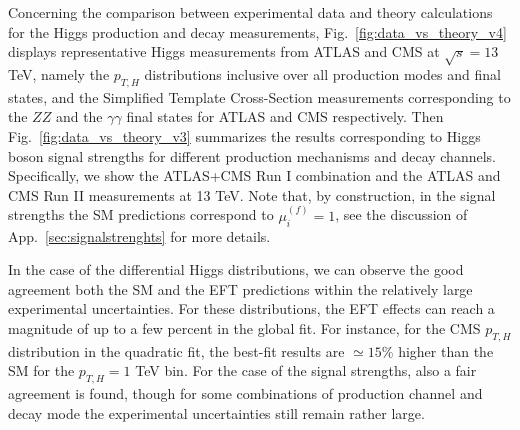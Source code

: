 Concerning the comparison between experimental data and theory calculations for the Higgs production
and decay measurements,  Fig.~\ref{fig:data_vs_theory_v4} displays
representative Higgs  measurements from ATLAS and CMS at $\sqrt{s}=13$ TeV,
namely the $p_{T,H}$ distributions inclusive over all production modes and final states,
and the Simplified Template Cross-Section measurements 
corresponding
to the $ZZ$  and the $\gamma\gamma$ final states for ATLAS and CMS
respectively.
%
Then Fig.~\ref{fig:data_vs_theory_v3} summarizes
the results corresponding to Higgs boson signal strengths for
different production mechanisms and decay channels.
%
Specifically, we show  the ATLAS+CMS Run I combination and the ATLAS and CMS Run II measurements at 13 TeV.
%
Note that, by construction, in the signal strengths the SM predictions correspond to $\mu_i^{(f)}=1$,
see the discussion of App.~\ref{sec:signalstrenghts} for more details.

In the case of the differential Higgs distributions, we can observe the good agreement
both the SM and the EFT predictions within the relatively large
experimental uncertainties.
%
For these distributions, the EFT effects can reach a magnitude of up to a few percent
in the global fit.
%
For instance, for the CMS $p_{T,H}$ distribution in the quadratic fit,
the best-fit results are $\simeq 15\%$ higher than the SM for the $p_{T,H}=1$ TeV bin.
%
For the case of the signal strengths, also a fair agreement is found, though for some combinations
of production channel and decay mode the experimental uncertainties still remain
rather large.

